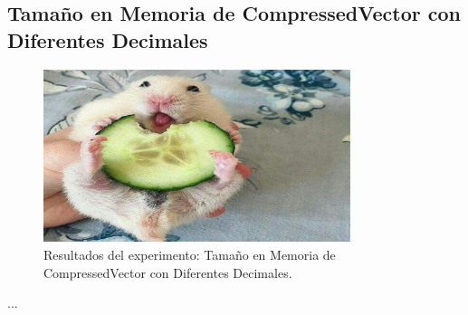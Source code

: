 \subsection{Tamaño en Memoria de CompressedVector con Diferentes Decimales}
\label{exp:cvd-size-decimals}

\begin{figure}[H]
    \centering
    \includegraphics[width=0.8\textwidth]{testing/images/cvd_size_decimals.png}
    \caption{Resultados del experimento: Tamaño en Memoria de CompressedVector con Diferentes Decimales.}
    \label{fig:cvd-size-decimals}
\end{figure}

...
